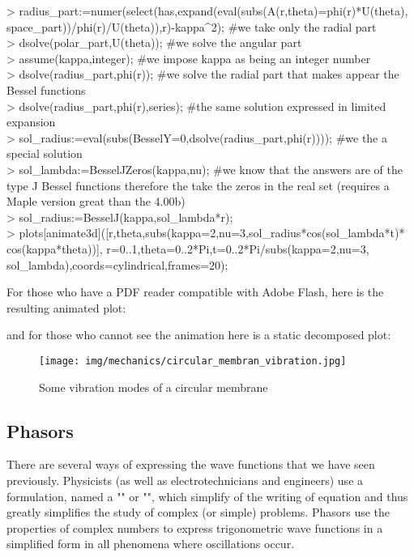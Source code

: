 {	> radius\_part:=numer(select(has,expand(eval(subs(A(r,theta)=phi(r)*U(theta),\\
	space\_part))/phi(r)/U(theta)),r)-kappa\string^2); \#we take only the radial part\\
	> dsolve(polar\_part,U(theta)); \#we solve the angular part\\
	> assume(kappa,integer); \#we impose kappa as being an integer number\\
	> dsolve(radius\_part,phi(r)); \#we solve the radial part that makes appear the Bessel functions\\
	> dsolve(radius\_part,phi(r),series); \#the same solution expressed in limited expansion\\
	> sol\_radius:=eval(subs(BesselY=0,dsolve(radius\_part,phi(r)))); \#we the a special solution\\
	> sol\_lambda:=BesselJZeros(kappa,nu); \#we know that the answers are of the type J Bessel functions therefore the take the zeros in the real set (requires a Maple version great than the 4.00b)\\
	> sol\_radius:=BesselJ(kappa,sol\_lambda*r);\\
	> plots[animate3d]([r,theta,subs(kappa=2,nu=3,sol\_radius*cos(sol\_lambda*t)*\\cos(kappa*theta))],
	r=0..1,theta=0..2*Pi,t=0..2*Pi/subs(kappa=2,nu=3,\\
	sol\_lambda),coords=cylindrical,frames=20);}
	
	For those who have a PDF reader compatible with Adobe Flash, here is the resulting animated plot:
	\begin{center}
		\centering
	\end{center}
	and for those who cannot see the animation here is a static decomposed plot:
	\begin{figure}[H]
		\centering
		\texttt{[image: img/mechanics/circular\_membran\_vibration.jpg]}
		\caption{Some vibration modes of a circular membrane}
	\end{figure}
	
	\pagebreak
	\subsection{Phasors}
	There are several ways of expressing the wave functions that we have seen previously. Physicists (as well as electrotechnicians and engineers) use a formulation, named a "" or "", which simplify of the writing of equation and thus greatly simplifies the study of complex (or simple) problems. Phasors use the properties of complex numbers to express trigonometric wave functions in a simplified form in all phenomena where oscillations occur.

